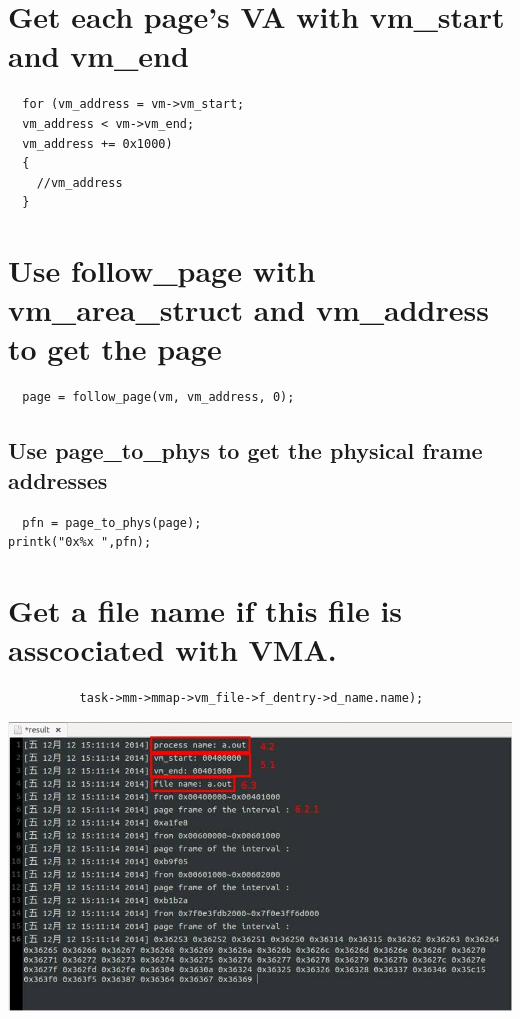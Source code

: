 
  \section{Get each page's VA with vm\_start and vm\_end}
  \begin{verbatim}
  for (vm_address = vm->vm_start;
  vm_address < vm->vm_end;
  vm_address += 0x1000)
  {
    //vm_address
  }
  \end{verbatim}
  
  \section{Use follow\_page with vm\_area\_struct and vm\_address to get the page}
  \begin{verbatim}
  page = follow_page(vm, vm_address, 0);
  \end{verbatim}
   \subsection{Use page\_to\_phys to get the physical frame addresses}
  \begin{verbatim}
  pfn = page_to_phys(page);
printk("0x%x ",pfn);
  \end{verbatim}

  \section{Get a file name if this file is asscociated with VMA.}
  \begin{verbatim}
          task->mm->mmap->vm_file->f_dentry->d_name.name);
  \end{verbatim}

\includegraphics[scale=0.45]{pic/result.jpg}
